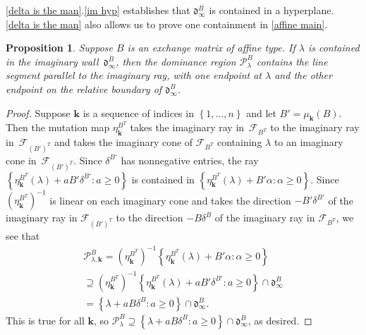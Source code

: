 \documentclass{amsart}
\newtheorem{proposition}{Proposition}[section]
\theoremstyle{definition}
\theoremstyle{remark}
\numberwithin{equation}{section}
\newcommand{\set}[1]{{\left\lbrace #1 \right\rbrace}}
\newcommand{\F}{{\mathcal F}}
\newcommand{\0}{{\mathbf{0}}}
\newcommand{\kk}{\mathbf{k}}
\renewcommand{\P}{\mathcal{P}}
\renewcommand{\d}{{\mathfrak d}}
\begin{document}
\cref{delta is the man}.\ref{im hyp} establishes that $\d^B_\infty$ is contained in a hyperplane.
\cref{delta is the man} also allows us to prove one containment in \cref{affine main}.

\begin{proposition}\label{affine main partial}
Suppose $B$ is an exchange matrix of affine type.
If $\lambda$ is contained in the imaginary wall~$\d^B_\infty$, then the dominance region $\P^B_\lambda$ \emph{contains} the line segment parallel to the imaginary ray, with one endpoint at $\lambda$ and the other endpoint on the relative boundary of $\d^B_\infty$.
\end{proposition}
\begin{proof}
Suppose $\kk$ is a sequence of indices in $\set{1,\ldots,n}$ and let $B'=\mu_\kk(B)$.
Then the mutation map $\eta^{B^T}_\kk$ takes the imaginary ray in~$\F_{B^T}$ to the imaginary ray in~$\F_{(B')^T}$ and takes the imaginary cone of $\F_{B^T}$ containing $\lambda$ to an imaginary cone in~$\F_{(B')^T}$.
Since $\delta^{B'}$ has nonnegative entries, the ray $\set{\eta^{B^T}_\kk(\lambda)+aB'\delta^{B'}:a\ge0}$ is contained in $\set{\eta^{B^T}_\kk(\lambda)+B'\alpha:\alpha\ge0}$.
Since $(\eta_\kk^{B^T})^{-1}$ is linear on each imaginary cone and takes the direction $-B'\delta^{B'}$ of the imaginary ray in $\F_{(B')^T}$ to the direction $-B\delta^B$ of the imaginary ray in $\F_{B^T}$, we see that 
\begin{multline*}
\P^B_{\lambda,\kk}=(\eta_\kk^{B^T})^{-1}\set{\eta^{B^T}_\kk(\lambda)+B'\alpha:\alpha\ge0}\\
\supseteq(\eta_\kk^{B^T})^{-1}\set{\eta^{B^T}_\kk(\lambda)+aB'\delta^{B'}:a\ge0}\cap\d^B_\infty\\
=\set{\lambda+aB\delta^B:a\ge0}\cap\d^B_\infty. 
\end{multline*}
This is true for all $\kk$, so $\P^B_\lambda\supseteq\set{\lambda+aB\delta^B:a\ge0}\cap\d^B_\infty$, as desired.
\end{proof}






\end{document}
